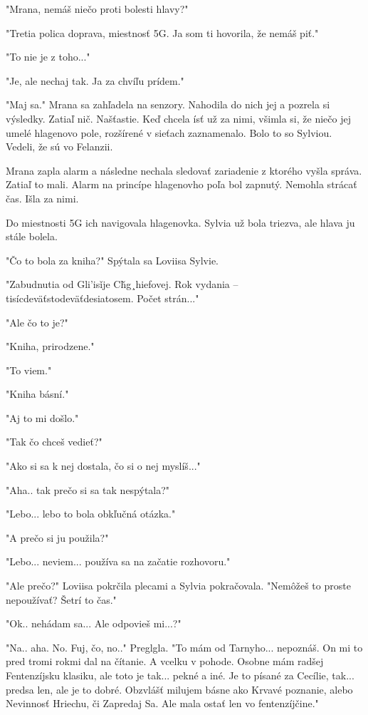 \documentclass{book}
\begin{document}
"$ $Mrana, nemáš niečo proti bolesti hlavy?"$ $ 

"$ $Tretia polica doprava, miestnosť 5G. Ja som ti hovorila, že nemáš piť."$ $ 

"$ $To nie je z toho..."$ $ 

"$ $Je, ale nechaj tak. Ja za chvíľu prídem."$ $ 

"$ $Maj sa."$ $  Mrana sa zahľadela na senzory. Nahodila do nich jej a pozrela si výsledky. Zatiaľ nič. Našťastie. Keď chcela ísť už za nimi, všimla si, že niečo jej umelé hlagenovo pole, rozšírené v sieťach zaznamenalo. Bolo to so Sylviou. Vedeli, že sú vo Felanzii.

Mrana zapla alarm a následne nechala sledovať zariadenie z ktorého vyšla správa. Zatiaľ to mali. Alarm na princípe hlagenovho poľa bol zapnutý. Nemohla strácať čas. Išla za nimi.

Do miestnosti 5G ich navigovala hlagenovka. Sylvia už bola triezva, ale hlava ju stále bolela.

"$ $Čo to bola za kniha?"$ $  Spýtala sa Loviisa Sylvie.

"$ $Zabudnutia od Gli'isi\v{}je Ch\v{}g¸hiefovej. Rok vydania – tisícdeväťstodeväťdesiatosem. Počet strán..."$ $ 

"$ $Ale čo to je?"$ $ 

"$ $Kniha, prirodzene."$ $ 

"$ $To viem."$ $ 

"$ $Kniha básní."$ $ 

"$ $Aj to mi došlo."$ $ 

"$ $Tak čo chceš vedieť?"$ $ 

"$ $Ako si sa k nej dostala, čo si o nej myslíš..."$ $ 

"$ $Aha.. tak prečo si sa tak nespýtala?"$ $ 

"$ $Lebo... lebo to bola obkľučná otázka."$ $ 

"$ $A prečo si ju použila?"$ $ 

"$ $Lebo... neviem... používa sa na začatie rozhovoru."$ $ 

"$ $Ale prečo?"$ $  Loviisa pokrčila plecami a Sylvia pokračovala. "$ $Nemôžeš to proste nepoužívať? Šetrí to čas."$ $ 

"$ $Ok.. nehádam sa... Ale odpovieš mi...?"$ $ 

"$ $Na.. aha. No. Fuj, čo, no.."$ $  Preglgla. "$ $To mám od Tarnyho... nepoznáš. On mi to pred tromi rokmi dal na čítanie. A vcelku v pohode. Osobne mám radšej Fentenzíjsku klasiku, ale toto je tak... pekné a iné. Je to písané za Cecílie, tak... predsa len, ale je to dobré. Obzvlášť milujem básne ako Krvavé poznanie, alebo Nevinnosť Hriechu, či Zapredaj Sa. Ale mala ostať len vo fentenzíjčine."$ $ 
\end{document}
